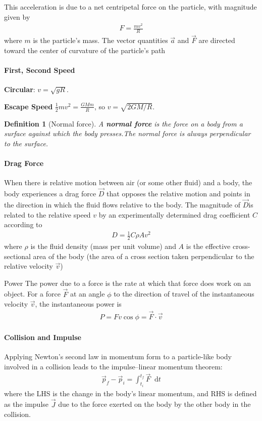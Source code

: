 \documentclass{article}
\newcommand*\diff{\mathop{}\!\mathrm{d}}
\numberwithin{equation}{subsection} %
\newtheorem{defi}{Definition}[section]
\theoremstyle{definition}
\begin{document}
This acceleration is due to a net centripetal force on the particle,
with magnitude given by
\begin{align}
    F = \frac{mv^2}{R}
\end{align}
where $m$ is the particle’s mass. The vector quantities $\vec a$ and
$\vec F$ are directed toward the center of curvature of the particle’s
path

\paragraph{First, Second Speed}

\textbf{Circular}: $v = \sqrt{gR}$.

\textbf{Escape Speed} $\frac{1}{2}mv^2 = \frac{GMm}{R}$, so
$v=\sqrt{2GM/R}$.
\begin{defi}[Normal force]
A \textbf{normal force} is the force on a body from a surface against
which the body presses.The normal force is always perpendicular to the
surface.
\end{defi}

\paragraph{Drag Force} When there is relative motion between air (or
some other fluid) and a body, the body experiences a drag force $\vec
D$
that opposes the relative motion and points in the direction in
which the fluid flows relative to the body. The magnitude of $\vec D$is
related to the relative speed $v$ by an experimentally determined
drag coefficient $C$ according to
\begin{align}
    D=\frac{1}{2} C\rho A v^2
\end{align}
where $\rho$ is the fluid density (mass per unit volume) and $A$ is
the effective cross-sectional area of the body (the area of a cross
section taken perpendicular to the relative velocity $\vec v$)

Power The power due to a force is the rate at which that force
does work on an object. For a force $\vec F$ at an angle $\phi$ to the
direction of travel of the instantaneous velocity $\vec v$, the
instantaneous power is
\begin{align}
    P = Fv \cos{\phi} = \vec{F} \cdot \vec{v}
\end{align}

\paragraph{Collision and Impulse} Applying Newton’s second law in
momentum form to a particle-like body involved in a collision
leads to the impulse–linear momentum theorem:
\begin{align}
    \vec{p}_f - \vec{p}_i = \int_{t_i}^{t_f} \vec{F} \diff t
\end{align}
where the LHS is the change in the body’s linear
momentum, and RHS is defined as the impulse $\vec{J}$ due to the force
exerted on the body by the other body in the collision.
\end{document}
